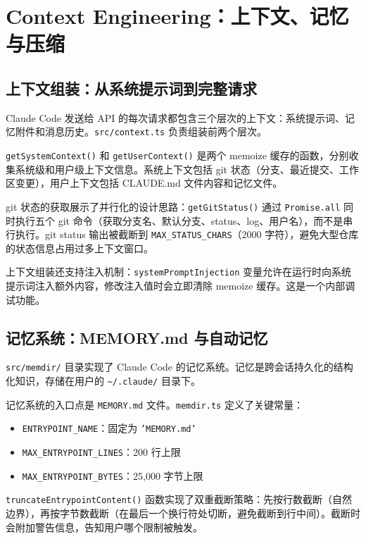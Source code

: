 \chapter{Context Engineering：上下文、记忆与压缩}

\section{上下文组装：从系统提示词到完整请求}

Claude Code 发送给 API 的每次请求都包含三个层次的上下文：系统提示词、记忆附件和消息历史。\texttt{src/context.ts} 负责组装前两个层次。

\texttt{getSystemContext()} 和 \texttt{getUserContext()} 是两个 memoize 缓存的函数，分别收集系统级和用户级上下文信息。系统上下文包括 git 状态（分支、最近提交、工作区变更），用户上下文包括 CLAUDE.md 文件内容和记忆文件。

git 状态的获取展示了并行化的设计思路：\texttt{getGitStatus()} 通过 \texttt{Promise.all} 同时执行五个 git 命令（获取分支名、默认分支、status、log、用户名），而不是串行执行。git status 输出被截断到 \texttt{MAX\_STATUS\_CHARS}（2000 字符），避免大型仓库的状态信息占用过多上下文窗口。

上下文组装还支持注入机制：\texttt{systemPromptInjection} 变量允许在运行时向系统提示词注入额外内容，修改注入值时会立即清除 memoize 缓存。这是一个内部调试功能。

\section{记忆系统：MEMORY.md 与自动记忆}

\texttt{src/memdir/} 目录实现了 Claude Code 的记忆系统。记忆是跨会话持久化的结构化知识，存储在用户的 \texttt{\~{}/.claude/} 目录下。

记忆系统的入口点是 \texttt{MEMORY.md} 文件。\texttt{memdir.ts} 定义了关键常量：

\begin{itemize}
  \item \texttt{ENTRYPOINT\_NAME}：固定为 \texttt{'MEMORY.md'}
  \item \texttt{MAX\_ENTRYPOINT\_LINES}：200 行上限
  \item \texttt{MAX\_ENTRYPOINT\_BYTES}：25,000 字节上限
\end{itemize}

\texttt{truncateEntrypointContent()} 函数实现了双重截断策略：先按行数截断（自然边界），再按字节数截断（在最后一个换行符处切断，避免截断到行中间）。截断时会附加警告信息，告知用户哪个限制被触发。


